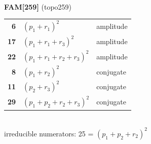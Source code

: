 \documentclass[10pt]{article}
\begin{document}
\begin{minipage}[t]{0.48\textwidth}
{}\\[2mm]\textbf{FAM[259]} (topo259)\\[2pt]{\footnotesize\begin{tabular}{@{}r@{\ \ }l@{\ \ }l@{}}\textbf{6} & $(p_1+r_1)^2$ & amplitude\\
\textbf{17} & $(p_1+r_1+r_3)^2$ & amplitude\\
\textbf{22} & $(p_1+r_1+r_2+r_3)^2$ & amplitude\\
\textbf{8} & $(p_1+r_2)^2$ & conjugate\\
\textbf{11} & $(p_2+r_3)^2$ & conjugate\\
\textbf{29} & $(p_1+p_2+r_2+r_3)^2$ & conjugate\\\end{tabular}}\\[2pt]{\scriptsize irreducible numerators: 25 = $(p_1+p_2+r_2)^2$}\end{minipage}

\bigskip
\end{document}
